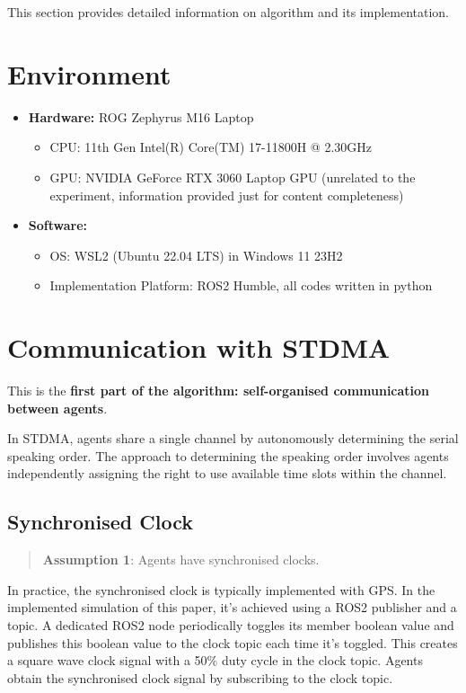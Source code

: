 This section provides detailed information on algorithm and its implementation.

\section*{Environment}

\begin{itemize}
    \item \textbf{Hardware:} ROG Zephyrus M16 Laptop
    \begin{itemize}
        \item CPU: 11th Gen Intel(R) Core(TM) 17-11800H @ 2.30GHz
        \item GPU: NVIDIA GeForce RTX 3060 Laptop GPU (unrelated to the experiment, information provided just for content completeness)
    \end{itemize}
    \item \textbf{Software:}
    \begin{itemize}
        \item OS: WSL2 (Ubuntu 22.04 LTS) in Windows 11 23H2
        \item Implementation Platform: ROS2 Humble, all codes written in python
    \end{itemize}
\end{itemize}

\section{Communication with STDMA}

This is the \textbf{first part of the algorithm: self-organised communication between agents}.

In STDMA, agents share a single channel by autonomously determining the serial speaking order.
The approach to determining the speaking order involves agents independently assigning the right to use available time slots within the channel.

\subsection{Synchronised Clock}

\begin{quotation}
    \textbf{Assumption 1}: 
    Agents have synchronised clocks. 
\end{quotation}

In practice, the synchronised clock is typically implemented with GPS. 
In the implemented simulation of this paper, it's achieved using a ROS2 publisher and a topic.
A dedicated ROS2 node periodically toggles its member boolean value and publishes this boolean value to the clock topic each time it's toggled. This creates a square wave clock signal with a 50\% duty cycle in the clock topic.
Agents obtain the synchronised clock signal by subscribing to the clock topic.

